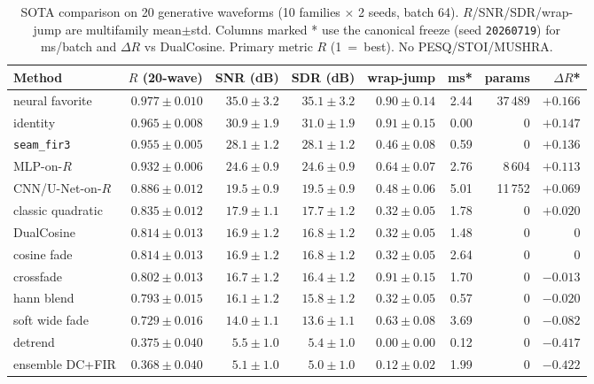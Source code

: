 \begin{table}[t]
  \centering
  \caption{SOTA comparison on 20 generative waveforms (10 families $\times$ 2 seeds, batch 64).
  $R$/SNR/SDR/wrap-jump are multifamily mean$\pm$std. Columns marked * use the canonical freeze (seed \texttt{20260719}) for ms/batch and $\Delta R$ vs DualCosine.
  Primary metric $R$ (1~=~best). No PESQ/STOI/MUSHRA.}
  \label{tab:sota-main}
  \setlength{\tabcolsep}{2.2pt}
  \begin{tabular}{@{}lrrrrrrr@{}}
    \toprule
    Method & $R$ (20-wave) & SNR (dB) & SDR (dB) & wrap-jump & ms* & params & $\Delta R$* \\
    \midrule
    neural favorite & $0.977\pm0.010$ & $35.0\pm3.2$ & $35.1\pm3.2$ & $0.90\pm0.14$ & 2.44 & 37\,489 & ${+}0.166$ \\
    identity & $0.965\pm0.008$ & $30.9\pm1.9$ & $31.0\pm1.9$ & $0.91\pm0.15$ & 0.00 & 0 & ${+}0.147$ \\
    \texttt{seam\_fir3} & $0.955\pm0.005$ & $28.1\pm1.2$ & $28.1\pm1.2$ & $0.46\pm0.08$ & 0.59 & 0 & ${+}0.136$ \\
    MLP-on-$R$ & $0.932\pm0.006$ & $24.6\pm0.9$ & $24.6\pm0.9$ & $0.64\pm0.07$ & 2.76 & 8\,604 & ${+}0.113$ \\
    CNN/U-Net-on-$R$ & $0.886\pm0.012$ & $19.5\pm0.9$ & $19.5\pm0.9$ & $0.48\pm0.06$ & 5.01 & 11\,752 & ${+}0.069$ \\
    classic quadratic & $0.835\pm0.012$ & $17.9\pm1.1$ & $17.7\pm1.2$ & $0.32\pm0.05$ & 1.78 & 0 & ${+}0.020$ \\
    DualCosine & $0.814\pm0.013$ & $16.9\pm1.2$ & $16.8\pm1.2$ & $0.32\pm0.05$ & 1.48 & 0 & $0$ \\
    cosine fade & $0.814\pm0.013$ & $16.9\pm1.2$ & $16.8\pm1.2$ & $0.32\pm0.05$ & 2.64 & 0 & $0$ \\
    crossfade & $0.802\pm0.013$ & $16.7\pm1.2$ & $16.4\pm1.2$ & $0.91\pm0.15$ & 1.70 & 0 & ${-}0.013$ \\
    hann blend & $0.793\pm0.015$ & $16.1\pm1.2$ & $15.8\pm1.2$ & $0.32\pm0.05$ & 0.57 & 0 & ${-}0.020$ \\
    soft wide fade & $0.729\pm0.016$ & $14.0\pm1.1$ & $13.6\pm1.1$ & $0.63\pm0.08$ & 3.69 & 0 & ${-}0.082$ \\
    detrend & $0.375\pm0.040$ & $5.5\pm1.0$ & $5.4\pm1.0$ & $0.00\pm0.00$ & 0.12 & 0 & ${-}0.417$ \\
    ensemble DC+FIR & $0.368\pm0.040$ & $5.1\pm1.0$ & $5.0\pm1.0$ & $0.12\pm0.02$ & 1.99 & 0 & ${-}0.422$ \\
    \bottomrule
  \end{tabular}
\end{table}

